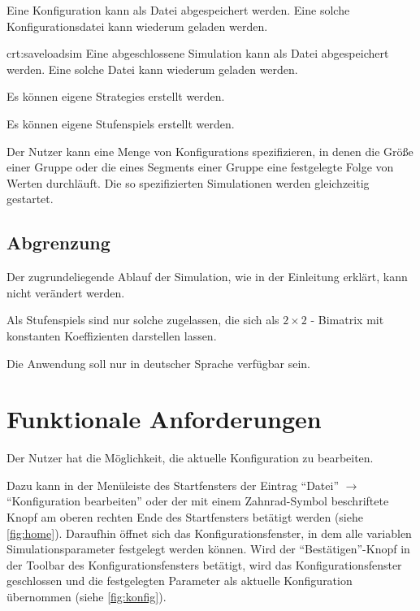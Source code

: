 \documentclass[parskip=full,11pt]{scrartcl}
\def\segment{Segment}
\begin{document}
Eine \Gls{Konfiguration} kann als Datei abgespeichert werden. Eine solche Konfigurationsdatei kann wiederum geladen werden.

{crt:saveloadsim}
Eine abgeschlossene Simulation kann als Datei abgespeichert werden. Eine solche Datei kann wiederum geladen werden.

Es können eigene \Glspl{Strategie} erstellt werden.

Es können eigene \Glspl{Stufenspiel} erstellt werden.

Der \Gls{Nutzer} kann eine Menge von \Glspl{Konfiguration} spezifizieren, in denen die Größe einer Gruppe oder die eines \segment s einer Gruppe eine festgelegte Folge von Werten durchläuft. Die so spezifizierten Simulationen werden gleichzeitig gestartet.

\subsection{Abgrenzung}

Der zugrundeliegende Ablauf der Simulation, wie in der Einleitung erklärt, kann nicht verändert werden.

Als \Glspl{Stufenspiel} sind nur solche zugelassen, die sich als \(2 \times 2\) - \Gls{Bimatrix} mit konstanten Koeffizienten darstellen lassen.

Die Anwendung soll nur in deutscher Sprache verfügbar sein.

\pagebreak

\section{Funktionale Anforderungen}

Der \Gls{Nutzer} hat die Möglichkeit, die \Gls{aktuelle Konfiguration} zu bearbeiten.

Dazu kann in der Menüleiste des Startfensters der Eintrag \enquote{Datei} \(\rightarrow\) \enquote{\Gls{Konfiguration} bearbeiten} oder der mit einem Zahnrad-Symbol beschriftete Knopf am oberen rechten Ende des Startfensters betätigt werden (siehe \cref{fig:home}). Daraufhin öffnet sich das Konfigurationsfenster, in dem alle variablen Simulationsparameter festgelegt werden können. Wird der \enquote{Bestätigen}-Knopf in der Toolbar des Konfigurationsfensters betätigt, wird das Konfigurationsfenster geschlossen und die festgelegten Parameter als \Gls{aktuelle Konfiguration} übernommen (siehe \cref{fig:konfig}).
\end{document}
